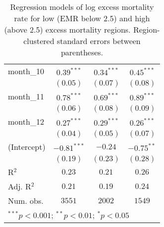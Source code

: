\begin{table}[h!]
\begin{center}
\begin{small}
\begin{tabular}{l c c c}
month\_10      & $0.39^{***}$  & $0.34^{***}$  & $0.45^{***}$  \\
               & $(0.05)$      & $(0.07)$      & $(0.08)$      \\
month\_11      & $0.78^{***}$  & $0.69^{***}$  & $0.89^{***}$  \\
               & $(0.06)$      & $(0.08)$      & $(0.09)$      \\
month\_12      & $0.27^{***}$  & $0.29^{***}$  & $0.26^{***}$  \\
               & $(0.04)$      & $(0.05)$      & $(0.07)$      \\
(Intercept)    & $-0.81^{***}$ & $-0.24$       & $-0.75^{**}$  \\
               & $(0.19)$      & $(0.23)$      & $(0.28)$      \\
\hline
R$^2$          & $0.23$        & $0.21$        & $0.26$        \\
Adj. R$^2$     & $0.21$        & $0.19$        & $0.24$        \\
Num. obs.      & $3551$        & $2002$        & $1549$        \\
\hline
\multicolumn{4}{l}{\tiny{$^{***}p<0.001$; $^{**}p<0.01$; $^{*}p<0.05$}}
\end{tabular}
\end{small}
\caption{Regression models of log excess mortality rate for low (EMR below 2.5) and high (above 2.5) excess mortality regions. Region-clustered standard errors between parentheses.}
\label{tab:hilomodels}
\end{center}
\end{table}
